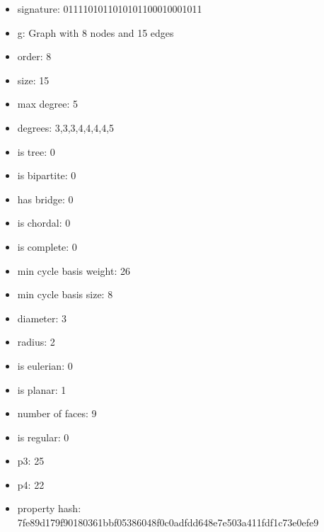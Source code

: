 \begin{itemize}
\item signature: 0111101011010101100010001011
\item g: Graph with 8 nodes and 15 edges
\item order: 8
\item size: 15
\item max degree: 5
\item degrees: 3,3,3,4,4,4,4,5
\item is tree: 0
\item is bipartite: 0
\item has bridge: 0
\item is chordal: 0
\item is complete: 0
\item min cycle basis weight: 26
\item min cycle basis size: 8
\item diameter: 3
\item radius: 2
\item is eulerian: 0
\item is planar: 1
\item number of faces: 9
\item is regular: 0
\item p3: 25
\item p4: 22
\item property hash: 7fe89d179f90180361bbf05386048f0c0adfdd648e7e503a411fdf1c73e0efe9
\end{itemize}
\newpage
\begin{figure}
\end{figure}
